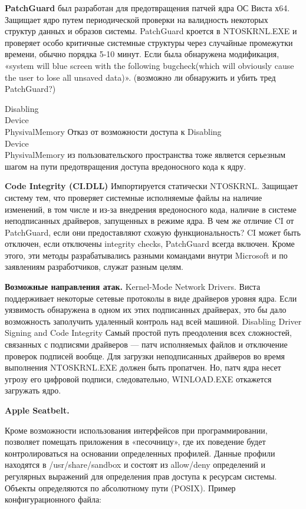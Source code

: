 \bigskip
{\bfseries PatchGuard} был разработан для предотвращения патчей ядра ОС Виста х64. Защищает ядро путем периодической проверки на валидность некоторых структур данных и образов системы. PatchGuard кроется в NTOSKRNL.EXE и проверяет особо критичные системные структуры через случайные промежутки времени, обычно порядка 5-10 минут. Если была обнаружена модификация, «system will blue screen with the following bugcheck(which will obviously cause the user to lose all unsaved data)». (возможно ли обнаружить и убить тред PatchGuard?) 

\bigskip
Disabling \\Device\\PhysivalMemory 
Отказ от возможности доступа к Disabling \\ Device\\ PhysivalMemory из пользовательского пространства тоже является серьезным шагом на пути предотвращения доступа вредоносного кода к ядру. 

\bigskip
{\bfseries Code Integrity (CI.DLL) }
Импортируется статически NTOSKRNL. Защищает систему тем, что проверяет  системные исполняемые файлы на наличие изменений, в том числе и из-за внедрения вредоносного кода, наличие в системе неподписанных драйверов, запущенных в режиме ядра. В чем же отличие CI от PatchGuard, если они предоставляют схожую функциональность? CI может быть отключен, если отключены integrity checks, PatchGuard всегда включен. Кроме этого, эти методы разрабатывались разными командами внутри Microsoft и по заявлениям разработчиков, служат разным целям. 

\bigskip
{\bfseries Возможные направления атак. }
Kernel-Mode Network Drivers. 
Виста поддерживает некоторые сетевые протоколы в виде драйверов уровня ядра. Если уязвимость обнаружена в одном их этих подписанных драйверах, это бы дало возможность заполучить удаленный контроль над всей машиной. 
Disabling Driver Signing and Code Integrity 
Самый простой путь преодоления всех сложностей, связанных с подписями драйверов — патч исполняемых файлов и отключение проверок подписей вообще. Для загрузки неподписанных драйверов во время выполнения NTOSKRNL.EXE должен быть пропатчен. Но, патч ядра несет угрозу его цифровой подписи, следовательно, WINLOAD.EXE откажется загружать ядро.

\bigskip
{\bfseries Apple Seatbelt. }

Кроме возможности использования интерфейсов при программировании, позволяет помещать приложения в «песочницу», где их поведение будет контролироваться на основании определенных профилей. Данные профили находятся в /usr/share/sandbox и состоят из allow/deny определений и регулярных выражений для определения прав доступа к ресурсам системы. Объекты определяются по абсолютному пути (POSIX). 
Пример конфигурационного файла: 

